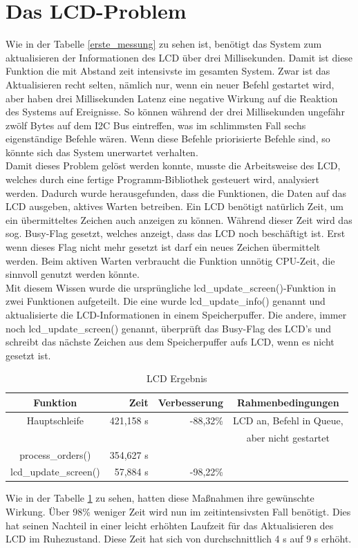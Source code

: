 \section{Das LCD-Problem\label{chapter_lcd_problem}}
Wie in der Tabelle \ref{erste_messung} zu sehen ist, benötigt das System zum aktualisieren der Informationen
des LCD über drei Millisekunden. Damit ist diese Funktion die mit Abstand zeit intensivste im gesamten System.
Zwar ist das Aktualisieren recht selten, nämlich nur, wenn ein neuer Befehl gestartet wird, aber haben drei
Millisekunden Latenz eine negative Wirkung auf die Reaktion des Systems auf Ereignisse. So können während
der drei Millisekunden ungefähr zwölf Bytes auf dem I2C Bus eintreffen, was im schlimmsten Fall sechs eigenständige
Befehle wären. Wenn diese Befehle priorisierte Befehle sind, so könnte sich das System unerwartet verhalten.\\
Damit dieses Problem gelöst werden konnte, musste die Arbeitsweise des LCD, welches durch eine fertige Programm-Bibliothek
gesteuert wird, analysiert werden. Dadurch wurde herausgefunden, dass die Funktionen, die Daten auf das LCD ausgeben,
aktives Warten betreiben. Ein LCD benötigt natürlich Zeit, um ein übermitteltes Zeichen auch anzeigen zu können.
Während dieser Zeit wird das sog. Busy-Flag gesetzt, welches anzeigt, dass das LCD noch beschäftigt ist. Erst
wenn dieses Flag nicht mehr gesetzt ist darf ein neues Zeichen übermittelt werden. Beim aktiven Warten verbraucht die
Funktion unnötig CPU-Zeit, die sinnvoll genutzt werden könnte.\\
Mit diesem Wissen wurde die ursprüngliche lcd\_\-update\_\-screen()-Funktion in zwei Funktionen aufgeteilt. Die eine
wurde lcd\_\-update\_\-info() genannt und aktualisierte die LCD-Informationen in einem Speicherpuffer. Die andere,
immer noch lcd\_\-update\_\-screen() genannt, überprüft das Busy-Flag des LCD's und schreibt das nächste Zeichen aus
dem Speicherpuffer aufs LCD, wenn es nicht gesetzt ist.
\begin{table}[htb]
\begin{center}
	\begin{tabular}{|c||r|r|c|}
		\hline
		\textbf{Funktion} & \textbf{Zeit} & \textbf{Verbesserung} & \textbf{Rahmenbedingungen} \\ \hline \hline
		Hauptschleife & 421,158 \textmu{}s & -88,32\% & LCD an, Befehl in Queue,\\
		& & & aber nicht gestartet \\ \hline
		process\_orders() & 354,627 \textmu{}s & & \\ \hline
		lcd\_update\_screen() & 57,884 \textmu{}s & -98,22\% & \\ \hline
	\end{tabular}
	\caption{\label{lcd_opt} LCD Ergebnis}
\end{center}
\end{table}
Wie in der Tabelle \ref{lcd_opt} zu sehen, hatten diese Maßnahmen ihre gewünschte Wirkung. Über 98\% weniger Zeit
wird nun im zeitintensivsten Fall benötigt. Dies hat seinen Nachteil in einer leicht erhöhten Laufzeit für das
Aktualisieren des LCD im Ruhezustand. Diese Zeit hat sich von durchschnittlich 4 \textmu{}s auf 9 \textmu{}s erhöht.
